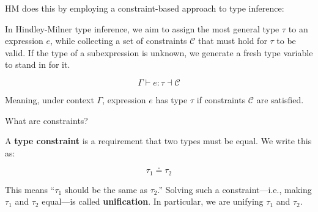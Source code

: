 \noindent
HM does this by employing a constraint-based approach to type inference:
\begin{Def}

    In Hindley-Milner type inference, we aim to assign the most general type $\tau$ to an expression $e$, while collecting a set of constraints $\mathcal{C}$ that must hold for $\tau$ to be valid.
    If the type of a subexpression is unknown, we generate a fresh type variable to stand in for it.
    
    \vspace{-1em}
    \LARGE
    \[
    \Gamma \vdash e : \tau \dashv \mathcal{C}
    \]
    \normalsize
    
    \noindent
    Meaning, under context $\Gamma$, expression $e$ has type $\tau$ if constraints $\mathcal{C}$ are satisfied.
\end{Def}

\newpage 


\noindent
What are constraints?

\begin{Def}

    A \textbf{type constraint} is a requirement that two types must be equal. We write this as:
    
    \vspace{-1.5em}
    \LARGE
    \[
    \tau_1 \doteq \tau_2
    \]
    \normalsize
    
    \noindent
    This means ``\(\tau_1\) should be the same as \(\tau_2\).''
    Solving such a constraint—i.e., making \(\tau_1\) and \(\tau_2\) equal—is called \textbf{unification}.
    In particular, we are unifying $\tau_1$ and $\tau_2$.
    \end{Def}
    
